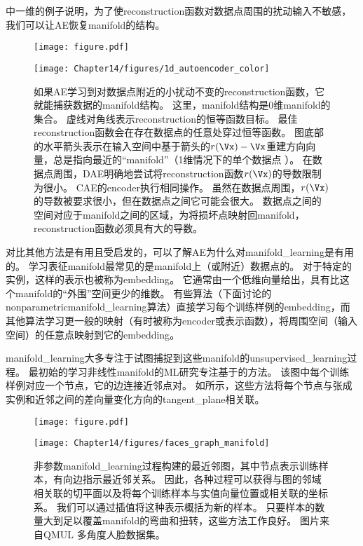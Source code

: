 中一维的例子说明，为了使\gls{reconstruction}函数对数据点周围的扰动输入不敏感，我们可以让\gls{AE}恢复\gls{manifold}的结构。

\begin{figure}[!htb]
\ifOpenSource
\centerline{\texttt{[image: figure.pdf]}}
\else
\centerline{\texttt{[image: Chapter14/figures/1d\_autoencoder\_color]}}
\fi
\caption{如果\gls{AE}学习到对数据点附近的小扰动不变的\gls{reconstruction}函数，它就能捕获数据的\gls{manifold}结构。
这里，\gls{manifold}结构是0维\gls{manifold}的集合。
虚线对角线表示\gls{reconstruction}的恒等函数目标。 
最佳\gls{reconstruction}函数会在存在数据点的任意处穿过恒等函数。
图底部的水平箭头表示在输入空间中基于箭头的$r(\Vx)-\Vx$重建方向向量，总是指向最近的``\gls{manifold}''（1维情况下的单个数据点 ）。
在数据点周围，\gls{DAE}明确地尝试将\gls{reconstruction}函数$r(\Vx)$的导数限制为很小。
\gls{CAE}的\gls{encoder}执行相同操作。
虽然在数据点周围，$r(\Vx)$的导数被要求很小，但在数据点之间它可能会很大。
数据点之间的空间对应于\gls{manifold}之间的区域，为将损坏点映射回\gls{manifold}，\gls{reconstruction}函数必须具有大的导数。
} \label{fig:chap14_1d_autoencoder_color}
\end{figure}


对比其他方法是有用且受启发的，可以了解\gls{AE}为什么对\gls{manifold_learning}是有用的。
学习表征\gls{manifold}最常见的是\gls{manifold}上（或附近）数据点的。
对于特定的实例，这样的表示也被称为\gls{embedding}。
它通常由一个低维向量给出，具有比这个\gls{manifold}的``外围''空间更少的维数。
有些算法（下面讨论的\gls{nonparametric}\gls{manifold_learning}算法）直接学习每个训练样例的\gls{embedding}，而其他算法学习更一般的映射（有时被称为\gls{encoder}或表示函数），将周围空间（输入空间）的任意点映射到它的\gls{embedding}。


\gls{manifold_learning}大多专注于试图捕捉到这些\gls{manifold}的\gls{unsupervised_learning}过程。
最初始的学习非线性\gls{manifold}的\gls{ML}研究专注基于的方法。
该图中每个训练样例对应一个节点，它的边连接近邻点对。
如所示，这些方法\citep{Scholkopf98,Roweis2000-lle-small,Tenenbaum2000-isomap,Brand2003-small,Belkin+Niyogi-2003,Donoho+Carrie-03,Weinberger04a-small,SNE-nips15-small,VanDerMaaten08-small}将每个节点与张成实例和近邻之间的差向量变化方向的\gls{tangent_plane}相关联。

\begin{figure}[!htb]
\ifOpenSource
\centerline{\texttt{[image: figure.pdf]}}
\else
\centerline{\texttt{[image: Chapter14/figures/faces\_graph\_manifold]}}
\fi
\caption{非参数\gls{manifold_learning}过程构建的最近邻图，其中节点表示训练样本，有向边指示最近邻关系。
因此，各种过程可以获得与图的邻域相关联的切平面以及将每个训练样本与实值向量位置或相关联的坐标系。
我们可以通过插值将这种表示概括为新的样本。
只要样本的数量大到足以覆盖\gls{manifold}的弯曲和扭转，这些方法工作良好。 
图片来自QMUL 多角度人脸数据集\citep{Gong-et-al-2000}。
}
\label{fig:chap14_faces_graph_manifold}
\end{figure}

